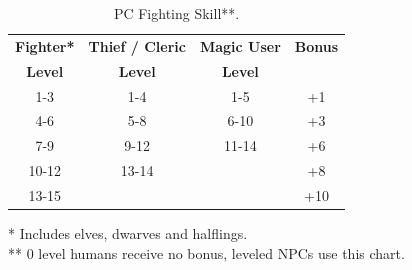 \documentclass[letterpaper,sansserif,tightsqueeze]{rpg-module}
\begin{document}
\begin{table}[h!]
	\centering
	\begin{tabular}{|c|c|c|c|}
		\hline
		\textbf{Fighter*}	& \textbf{Thief / Cleric}	& \textbf{Magic User}	& \textbf{Bonus}	\\
		\textbf{Level}		& \textbf{Level}			& \textbf{Level}	& \\ \hline
		1-3		& 1-4	& 1-5	& +1 	\\ \hline
		4-6		& 5-8	& 6-10	& +3  	\\ \hline
		7-9		& 9-12	& 11-14	& +6  	\\ \hline
		10-12	& 13-14	& 		& +8  	\\ \hline
		13-15	& 		& 		& +10 	\\ \hline
	\end{tabular}
	\caption{PC Fighting Skill**.}
	\label{table:PCFightingSkill}
\end{table}
\vspace{-0.5cm}
* Includes elves, dwarves and halflings.\\
** 0 level humans receive no bonus, leveled NPCs use this chart.
\end{document}
